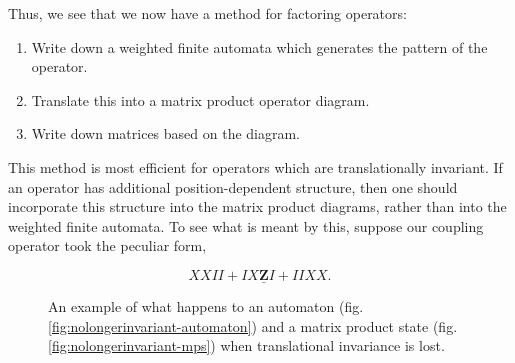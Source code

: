 \documentclass[12pt]{amsbook}
\theoremstyle{plain}
\theoremstyle{definition}
\theoremstyle{remark}
\begin{document}
Thus, we see that we now have a method for factoring operators:

\begin{enumerate}
\item Write down a weighted finite automata which generates the pattern of the operator.
\item Translate this into a matrix product operator diagram.
\item Write down matrices based on the diagram.
\end{enumerate}

This method is most efficient for operators which are translationally invariant.  If an operator has additional position-dependent structure, then one should incorporate this structure into the matrix product diagrams, rather than into the weighted finite automata.  To see what is meant by this, suppose our coupling operator took the peculiar form,

$$XXII + IX\underline{\textbf{Z}}I + IIXX.$$

\begin{figure}
\caption{An example of what happens to an automaton (fig. \ref{fig:nolongerinvariant-automaton}) and a matrix product state (fig. \ref{fig:nolongerinvariant-mps}) when translational invariance is lost.}
\end{figure}
\end{document}
